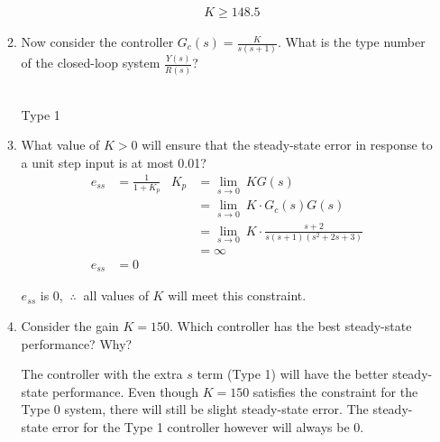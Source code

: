 \documentclass[11pt]{article}
\begin{document}
\begin{enumerate}
\begin{enumerate}
\begin{align*}
                &K\geq 148.5
            \end{align*}
            \item Now consider the controller \( G_c(s) = \displaystyle \frac{K}{s(s+1)} \). What is the type number of the closed-loop system \(\frac{Y(s)}{R(s)}\)?
            \begin{center}
                \\Type 1
            \end{center}
            \item What value of \( K > 0 \) will ensure that the steady-state error in response to a unit step input is at most 0.01?
            \begin{align*}
                e_{ss} &=\frac{1}{1+K_p} &K_p &= \lim_{s \to 0}\ KG(s)\\
                &&&=\lim_{s \to 0}\ K\cdot G_c(s)G(s)\\
                &&&=\lim_{s \to 0}\ K\cdot \frac{s+2}{s(s+1)(s^2+2s+3)}\\
                &&&=\infty\\
                e_{ss} &=0
            \end{align*}
            \begin{center}
                \(e_{ss}\) is 0, \(\ \therefore\ \) all values of \(K\) will meet this constraint.
            \end{center}
            \item Consider the gain \( K = 150 \). Which controller has the best steady-state performance? Why?
            \begin{center}
                The controller with the extra \(s\) term (Type 1) will have the better steady-state performance. Even though \( K = 150 \) satisfies the constraint for the Type 0 system, there will still be slight steady-state error. The steady-state error for the Type 1 controller however will always be 0.
            \end{center}
        \end{enumerate}
\end{enumerate}
\end{document}
